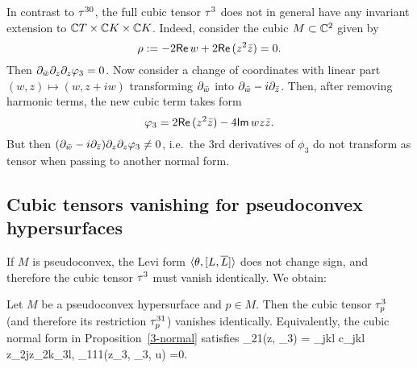 \documentclass[12pt]{amsart}
\begin{document}
\be
In contrast to $\tau^{30}$, the full cubic tensor $\tau^3$
does not in general have any invariant extension to
${\mathbb{C}} T\times {\mathbb{C}} K \times {\mathbb{C}} K$.
Indeed, consider the cubic $M\subset {\mathbb{C}}^2$ given by
$$
	\rho := -2{\sf Re}\, w + 2{\sf Re}\, (z^2{\bar z}) =0.
$$
Then $\partial_{{\bar w}} \partial_z \partial_z\varphi_3=0$.
Now consider a change of coordinates with linear part
$(w,z)\mapsto (w, z+ iw)$ transforming $\partial_{{\bar w}}$
into $\partial_{{\bar w}}-i\partial_{{\bar z}}$.
Then, after removing harmonic terms, the new cubic term takes form
$$
	\varphi_3 = 2{\sf Re}\, (z^2{\bar z}) - 4{\sf Im}\, w z{\bar z}.
$$
But then $(\partial_{{\bar w}} -i\partial_{{\bar z}}) \partial_z \partial_z\varphi_3\ne 0$, 
i.e.\ the $3$rd derivatives of $\phi_3$ do not transform as tensor
when passing to another normal form.
\ee



%
%





%


\subsection{Cubic tensors vanishing for pseudoconvex hypersurfaces}
If $M$ is pseudoconvex, the Levi form $\langle \theta, [L, \overline{L}]\rangle$
does not change sign, and therefore the cubic tensor $\tau^3$ must vanish identically. We obtain:

\bl{}
Let $M$ be a pseudoconvex hypersurface and $p\in M$.
Then the cubic tensor $\tau^3_p$ (and therefore its restriction $\tau^{31}_p$) vanishes identically.
Equivalently, the cubic normal form in Proposition~\ref{3-normal} satisfies
\beq{}
	\phi_{21}(z, \z_3) = \sum_{jkl} c_{jkl} z_{2j}z_{2k}\z_{3l},
	\quad
	\phi_{111}(z_3, \z_3, u) =0.
\eeq
\el
\end{document}
